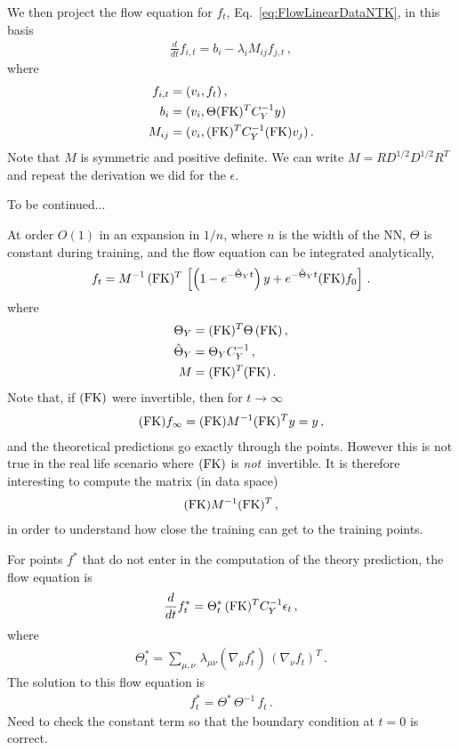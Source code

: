 \documentclass[11pt]{article}
\begin{document}
We then project the flow equation for $f_t$, Eq.~\ref{eq:FlowLinearDataNTK}, in this basis
\begin{align}
    \label{eq:FlowEigenbasisNTK}
    \frac{d}{dt} f_{i,t} = b_i - \lambda_i M_{ij} f_{j,t}\, ,
\end{align} 
where
\begin{align}
    f_{i,t} &= (v_i, f_t)\, , \\
    b_i &= (v_i, \Theta (\mathrm{FK})^T C_Y^{-1} y)\, \\
    M_{ij} &= (v_i, (\mathrm{FK})^T C_Y^{-1} (\mathrm{FK}) v_j)\, .
\end{align}
Note that $M$ is symmetric and positive definite. We can write $M = R D^{1/2} D^{1/2} R^T$ and repeat the 
derivation we did for the $\epsilon$.

To be continued... 

At order $O(1)$ in an expansion in $1/n$, where $n$ is the width of the NN, $\Theta$ is constant during training, and the flow equation can be integrated analytically, 
\begin{align}
    \label{eq:IntegrateFlowAtLeadingOrder}
    f_t = M^{-1}\, (\mathrm{FK})^T\, \left[
        \left(1 - e^{-\hat{\Theta}_Yt}\right) y +
        e^{-\hat{\Theta}_Y t} (\mathrm{FK}) f_0
    \right]\, .
\end{align}
where 
\begin{align}
    \label{eq:DefineThetaM}
    \Theta_Y &= (\mathrm{FK})^T \Theta\, (\mathrm{FK})\, , \\
    \hat{\Theta}_Y &= \Theta_Y C_Y^{-1}\, , \\    
    M &=  (\mathrm{FK})^T (\mathrm{FK})\, .
\end{align}
Note that, if $(\mathrm{FK})$ were invertible, then for $t\to\infty$
\begin{align}
    (\mathrm{FK}) f_\infty = (\mathrm{FK}) M^{-1} (\mathrm{FK})^T y = y\, ,
\end{align}
and the theoretical predictions go exactly through the points. However this is not true in the real life scenario where $(\mathrm{FK})$ is {\em not}\ invertible. It is therefore interesting to compute the matrix (in data space)
\begin{align}
    (\mathrm{FK}) M^{-1} (\mathrm{FK})^T \, ,    
\end{align}
in order to understand how close the training can get to the training points. 

For points $f^*$ that do not enter in the computation of the theory prediction, the flow 
equation is
\begin{align}
    \label{eq:FlowStarLinearDataNTK}
    \frac{d}{dt} f^*_t = 
        \Theta^*_t\, (\mathrm{FK})^T C_Y^{-1} \epsilon_t\, ,
\end{align}
where 
\begin{align}
    \label{eq:NTKStarDef}
    \Theta^*_t = \sum_{\mu,\nu}\, \lambda_{\mu\nu} \left(\nabla_\mu f^*_t\right)\, 
    \left(\nabla_\nu f_t\right)^T\, .
\end{align}
The solution to this flow equation is
\begin{align}
    \label{eq:IntegrateFlowAtLeadingOrderStar}
    f^*_t = \Theta^*\, \Theta^{-1}\, f_t \, . 
\end{align}
Need to check the constant term so that the boundary condition at $t=0$ is correct. 





\appendix
\end{document}

